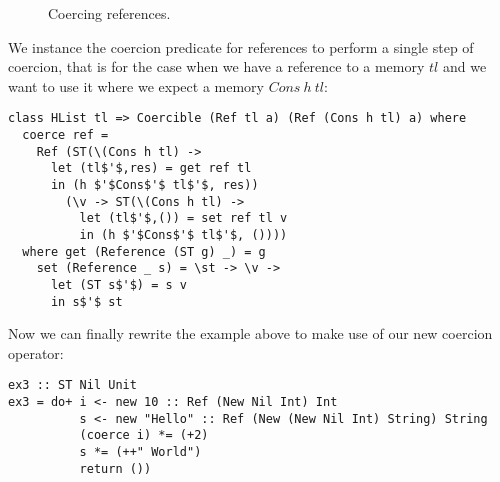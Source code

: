 \begin{figure}[h]
\centerline{} \caption{Coercing references.\label{fig:ref_coerce}}
\end{figure}

We instance the coercion predicate for references to perform a single step of coercion, that is for the case when we have a reference to a memory $tl$ and we want to use it where we expect a memory $Cons\ h\ tl$:
\begin{lstlisting}
class HList tl => Coercible (Ref tl a) (Ref (Cons h tl) a) where
  coerce ref =
    Ref (ST(\(Cons h tl) ->
      let (tl$'$,res) = get ref tl
      in (h $'$Cons$'$ tl$'$, res))
        (\v -> ST(\(Cons h tl) -> 
          let (tl$'$,()) = set ref tl v
          in (h $'$Cons$'$ tl$'$, ())))
  where get (Reference (ST g) _) = g
    set (Reference _ s) = \st -> \v -> 
      let (ST s$'$) = s v
      in s$'$ st
\end{lstlisting}

Now we can finally rewrite the example above to make use of our new coercion operator:
\begin{lstlisting}
ex3 :: ST Nil Unit
ex3 = do+ i <- new 10 :: Ref (New Nil Int) Int
          s <- new "Hello" :: Ref (New (New Nil Int) String) String
          (coerce i) *= (+2)
          s *= (++" World")
          return ())
\end{lstlisting}
